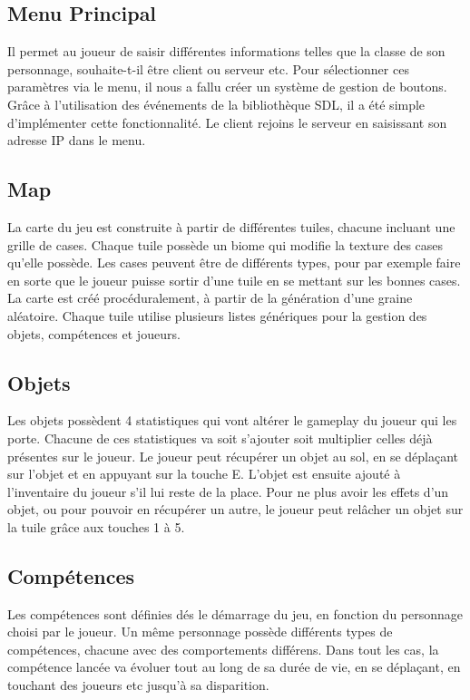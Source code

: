 \documentclass[11pt]{article}
\begin{document}
        \subsection{Menu Principal}
        Il permet au joueur de saisir différentes informations telles que la classe de son personnage, souhaite-t-il être client ou serveur etc. 
        Pour sélectionner ces paramètres via le menu, il nous a fallu créer un système de gestion de boutons. 
        Grâce à l'utilisation des événements de la bibliothèque SDL, il a été simple d'implémenter cette fonctionnalité. Le client rejoins le serveur en 
        saisissant son adresse IP dans le menu. 
        \subsection{Map}
        La carte du jeu est construite à partir de différentes tuiles, chacune incluant une grille de cases.
        Chaque tuile possède un biome qui modifie la texture des cases qu'elle possède.
        Les cases peuvent être de différents types, pour par exemple faire en sorte que le joueur puisse sortir d'une tuile en se mettant sur les bonnes cases.
        La carte est créé procéduralement, à partir de la génération d'une graine aléatoire.
        Chaque tuile utilise plusieurs listes génériques pour la gestion des objets, compétences et joueurs. 
        \subsection{Objets}
        Les objets possèdent 4 statistiques qui vont altérer le gameplay du joueur qui les porte.
        Chacune de ces statistiques va soit s'ajouter soit multiplier celles déjà présentes sur le joueur.
        Le joueur peut récupérer un objet au sol, en se déplaçant sur l'objet et en appuyant sur la touche E.
        L'objet est ensuite ajouté à l'inventaire du joueur s'il lui reste de la place.
        Pour ne plus avoir les effets d'un objet, ou pour pouvoir en récupérer un autre, le joueur peut relâcher un objet sur la tuile grâce aux touches 1 à 5.
        \subsection{Compétences}
        Les compétences sont définies dés le démarrage du jeu, en fonction du personnage choisi par le joueur.
        Un même personnage possède différents types de compétences, chacune avec des comportements différens.
        Dans tout les cas, la compétence lancée va évoluer tout au long de sa durée de vie, en se déplaçant, en touchant des joueurs etc jusqu'à sa disparition.
\end{document}

